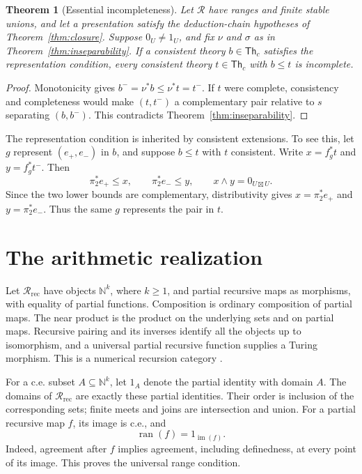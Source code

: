 \documentclass[11pt]{article}
\newtheorem{theorem}{Theorem}[section]
\theoremstyle{definition}
\newcommand{\R}{\mathscr R}
\newcommand{\ran}{\operatorname{ran}}
\newcommand{\Th}{\mathsf{Th}}
\begin{document}
\begin{theorem}[Essential incompleteness]\label{thm:essential}
Let $\R$ have ranges and finite stable unions, and let a presentation satisfy
the deduction-chain hypotheses of Theorem~\ref{thm:closure}. Suppose
$0_U\ne1_U$, and fix $\nu$ and $\sigma$ as in
Theorem~\ref{thm:inseparability}. If a consistent theory $b\in\Th_c$
satisfies the representation condition, every consistent theory
$t\in\Th_c$ with $b\le t$ is incomplete.
\end{theorem}
\begin{proof}
Monotonicity gives $b^-=\nu^*b\le\nu^*t=t^-$. If $t$ were complete,
consistency and completeness would make $(t,t^-)$ a complementary pair
relative to $s$ separating $(b,b^-)$. This contradicts
Theorem~\ref{thm:inseparability}.
\end{proof}

The representation condition is inherited by consistent extensions. To see
this, let $g$ represent $(e_+,e_-)$ in $b$, and suppose $b\le t$ with $t$
consistent. Write $x=f_g^*t$ and $y=f_g^*t^-$. Then
\[
 \pi_2^*e_+\le x,\qquad\pi_2^*e_-\le y,\qquad x\wedge y=0_{U\boxtimes U}.
\]
Since the two lower bounds are complementary, distributivity gives
$x=\pi_2^*e_+$ and $y=\pi_2^*e_-$. Thus the same $g$ represents the pair
in $t$.

\section{The arithmetic realization}

Let $\R_{\mathrm{rec}}$ have objects $\mathbb N^k$, where $k\ge1$, and partial
recursive maps as morphisms, with equality of partial functions. Composition
is ordinary composition of partial maps. The near product is the product on
the underlying sets and on partial maps. Recursive pairing and its inverses
identify all the objects up to isomorphism, and a universal partial recursive
function supplies a Turing morphism. This is a numerical recursion category
\cite{DPH,Heller}.

For a c.e. subset $A\subseteq\mathbb N^k$, let $1_A$ denote the partial
identity with domain $A$. The domains of $\R_{\mathrm{rec}}$ are exactly
these partial identities. Their order is inclusion of the corresponding
sets; finite meets and joins are intersection and union. For a partial
recursive map $f$, its image is c.e., and
\[
 \ran(f)=1_{\operatorname{im}(f)}.
\]
Indeed, agreement after $f$ implies agreement, including definedness, at
every point of its image. This proves the universal range condition.
\end{document}
